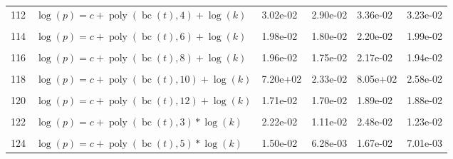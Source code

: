 \documentclass[12pt,a4paper]{article}
\DeclareMathOperator{\bc}{bc}
\DeclareMathOperator{\poly}{poly}
\begin{document}
\begin{longtable}[t]{ll>{\raggedleft\arraybackslash}p{2cm}>{\raggedleft\arraybackslash}p{2cm}>{\raggedleft\arraybackslash}p{2cm}>{\raggedleft\arraybackslash}p{2cm}}
112 & $\log(p) = c + \poly\left( \bc(t), 4 \right) + \log(k)$ & 3.02e-02 & 2.90e-02 & 3.36e-02 & 3.23e-02\\
\cellcolor{gray!6}{113} & \cellcolor{gray!6}{$\log(p) = c + \poly\left( \bc(t), 5 \right) + \log(k)$} & \cellcolor{gray!6}{2.26e-02} & \cellcolor{gray!6}{1.85e-02} & \cellcolor{gray!6}{2.51e-02} & \cellcolor{gray!6}{2.05e-02}\\
114 & $\log(p) = c + \poly\left( \bc(t), 6 \right) + \log(k)$ & 1.98e-02 & 1.80e-02 & 2.20e-02 & 1.99e-02\\
\cellcolor{gray!6}{115} & \cellcolor{gray!6}{$\log(p) = c + \poly\left( \bc(t), 7 \right) + \log(k)$} & \cellcolor{gray!6}{1.75e-02} & \cellcolor{gray!6}{1.73e-02} & \cellcolor{gray!6}{1.93e-02} & \cellcolor{gray!6}{1.91e-02}\\
116 & $\log(p) = c + \poly\left( \bc(t), 8 \right) + \log(k)$ & 1.96e-02 & 1.75e-02 & 2.17e-02 & 1.94e-02\\
\cellcolor{gray!6}{117} & \cellcolor{gray!6}{$\log(p) = c + \poly\left( \bc(t), 9 \right) + \log(k)$} & \cellcolor{gray!6}{2.42e-02} & \cellcolor{gray!6}{2.14e-02} & \cellcolor{gray!6}{2.69e-02} & \cellcolor{gray!6}{2.37e-02}\\
118 & $\log(p) = c + \poly\left( \bc(t), 10 \right) + \log(k)$ & 7.20e+02 & 2.33e-02 & 8.05e+02 & 2.58e-02\\
\cellcolor{gray!6}{119} & \cellcolor{gray!6}{$\log(p) = c + \poly\left( \bc(t), 11 \right) + \log(k)$} & \cellcolor{gray!6}{1.88e-02} & \cellcolor{gray!6}{1.82e-02} & \cellcolor{gray!6}{2.09e-02} & \cellcolor{gray!6}{2.01e-02}\\
120 & $\log(p) = c + \poly\left( \bc(t), 12 \right) + \log(k)$ & 1.71e-02 & 1.70e-02 & 1.89e-02 & 1.88e-02\\
\cellcolor{gray!6}{121} & \cellcolor{gray!6}{$\log(p) = c + \poly\left( \bc(t), 13 \right) + \log(k)$} & \cellcolor{gray!6}{1.71e-02} & \cellcolor{gray!6}{1.70e-02} & \cellcolor{gray!6}{1.89e-02} & \cellcolor{gray!6}{1.88e-02}\\
122 & $\log(p) = c + \poly\left( \bc(t), 3 \right) * \log(k)$ & 2.22e-02 & 1.11e-02 & 2.48e-02 & 1.23e-02\\
\cellcolor{gray!6}{123} & \cellcolor{gray!6}{$\log(p) = c + \poly\left( \bc(t), 4 \right) * \log(k)$} & \cellcolor{gray!6}{2.31e-02} & \cellcolor{gray!6}{2.19e-02} & \cellcolor{gray!6}{2.57e-02} & \cellcolor{gray!6}{2.44e-02}\\
124 & $\log(p) = c + \poly\left( \bc(t), 5 \right) * \log(k)$ & 1.50e-02 & 6.28e-03 & 1.67e-02 & 7.01e-03\\

\end{longtable}
\end{document}

